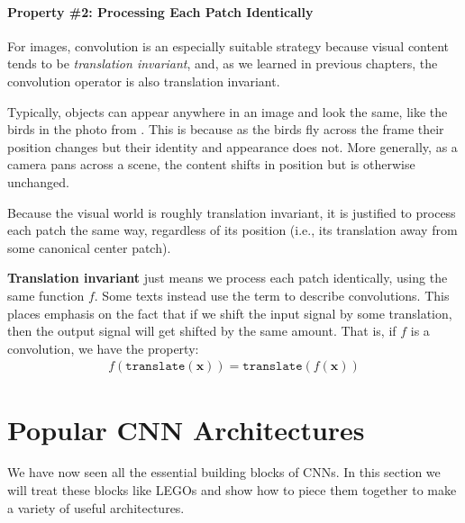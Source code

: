 \paragraph*{Property \#2: Processing Each Patch Identically}
For images, convolution is an especially suitable strategy because visual content tends to be \textit{translation invariant}, and, as we learned in previous chapters, the convolution operator is also translation invariant. 

Typically, objects can appear anywhere in an image and look the same, like the birds in the photo from \fig{\ref{fig:convolutional_neural_nets:CNNs_as_patch_processing}}. This is because as the birds fly across the frame their position changes but their identity and appearance does not. More generally, as a camera pans across a scene, the content shifts in position but is otherwise unchanged.

Because the visual world is roughly translation invariant, it is justified to process each patch the same way, regardless of its position (i.e., its translation away from some canonical center patch).

\textbf{Translation invariant} just means we process each patch identically, using the same function $f$. Some texts instead use the term  to describe convolutions. This places emphasis on the fact that if we shift the input signal by some translation, then the output signal will get shifted by the same amount. That is, if $f$ is a convolution, we have the property:
\begin{align}
    f(\texttt{translate}(\mathbf{x})) = \texttt{translate}(f(\mathbf{x}))
\end{align}



\section{Popular CNN Architectures}
\label{sec:convolutional_neural_nets:popular_architectures}
We have now seen all the essential building blocks of CNNs. In this section we will treat these blocks like LEGOs and show how to piece them together to make a variety of useful architectures.

